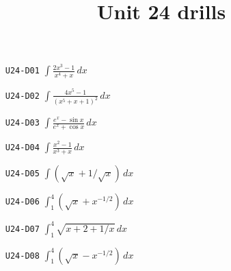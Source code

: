 \title{Unit 24 drills}\maketitle\begin{enumerate}
  \item[\texttt{U24-D01}] $\displaystyle \int\frac{2x^{3}-1}{x^{4}+x}\,dx$
  \item[\texttt{U24-D02}] $\displaystyle \int\frac{4x^{5}-1}{(x^{5}+x+1)^{2}}\,dx$
  \item[\texttt{U24-D03}] $\displaystyle \int\frac{e^{x}-\sin x}{e^{x}+\cos x}\,dx$
  \item[\texttt{U24-D04}] $\displaystyle \int\frac{x^{2}-1}{x^{3}+x}\,dx$
  \item[\texttt{U24-D05}] $\displaystyle \int(\sqrt{x}+1/\sqrt{x})\,dx$
  \item[\texttt{U24-D06}] $\displaystyle \int_{1}^{4}(\sqrt{x}+x^{-1/2})\,dx$
  \item[\texttt{U24-D07}] $\displaystyle \int_{1}^{4}\sqrt{x+2+1/x}\,dx$
  \item[\texttt{U24-D08}] $\displaystyle \int_{1}^{4}(\sqrt{x}-x^{-1/2})\,dx$
\end{enumerate}
